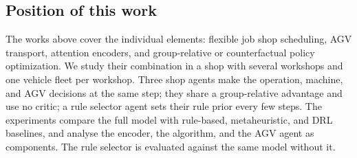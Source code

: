 \subsection{Position of this work}

The works above cover the individual elements: flexible job shop scheduling,
AGV transport, attention encoders, and group-relative or counterfactual
policy optimization. We study their combination in a shop with several
workshops and one vehicle fleet per workshop. Three shop agents make the
operation, machine, and AGV decisions at the same
step; they share a group-relative
advantage and use no critic; a rule selector agent sets their rule prior every
few steps. The experiments compare the full model with rule-based,
metaheuristic, and DRL baselines, and analyse the encoder, the
algorithm, and the AGV agent as components. The rule selector is evaluated
against the same model without it.

